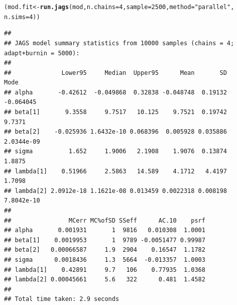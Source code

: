 \documentclass{beamer}\usepackage[]{graphicx}\usepackage[]{color}
\makeatletter
\newcommand{\hlnum}[1]{\textcolor[rgb]{0.686,0.059,0.569}{#1}}%
\newcommand{\hlstr}[1]{\textcolor[rgb]{0.192,0.494,0.8}{#1}}%
\newcommand{\hlstd}[1]{\textcolor[rgb]{0.345,0.345,0.345}{#1}}%
\newcommand{\hlkwb}[1]{\textcolor[rgb]{0.69,0.353,0.396}{#1}}%
\newcommand{\hlkwc}[1]{\textcolor[rgb]{0.333,0.667,0.333}{#1}}%
\newcommand{\hlkwd}[1]{\textcolor[rgb]{0.737,0.353,0.396}{\textbf{#1}}}%
\newenvironment{kframe}{%
 \def\at@end@of@kframe{}%
 \ifinner\ifhmode%
  \def\at@end@of@kframe{\end{minipage}}%
  \begin{minipage}{\columnwidth}%
 \fi\fi%
 \def\FrameCommand##1{\hskip\@totalleftmargin \hskip-\fboxsep
 \colorbox{shadecolor}{##1}\hskip-\fboxsep
     \hskip-\linewidth \hskip-\@totalleftmargin \hskip\columnwidth}%
 \MakeFramed {\advance\hsize-\width
   \@totalleftmargin\z@ \linewidth\hsize
   \@setminipage}}%
 {\par\unskip\endMakeFramed%
 \at@end@of@kframe}
\newenvironment{knitrout}{}{} %
\makeatother
\begin{document}
\newsavebox{\ipriorjagsc}
\begin{lrbox}{\ipriorjagsc}
\begin{knitrout}\scriptsize
{}\color{fgcolor}\begin{kframe}
\begin{alltt}
\hlstd{(mod.fit} \hlkwb{<-} \hlkwd{run.jags}\hlstd{(mod,} \hlkwc{n.chains} \hlstd{=} \hlnum{4}\hlstd{,} \hlkwc{sample} \hlstd{=} \hlnum{2500}\hlstd{,} \hlkwc{method} \hlstd{=} \hlstr{"parallel"}\hlstd{,}
                     \hlkwc{n.sims} \hlstd{=} \hlnum{4}\hlstd{))}
\end{alltt}
\begin{verbatim}
## 
## JAGS model summary statistics from 10000 samples (chains = 4; adapt+burnin = 5000):
##                                                                       
##              Lower95     Median  Upper95      Mean       SD       Mode
## alpha       -0.42612  -0.049868  0.32838 -0.048748  0.19132  -0.064045
## beta[1]       9.3558     9.7517   10.125    9.7521  0.19742     9.7371
## beta[2]    -0.025936 1.6432e-10 0.068396  0.005928 0.035886 2.0344e-09
## sigma          1.652     1.9006   2.1908    1.9076  0.13874     1.8875
## lambda[1]    0.51966     2.5863   14.589    4.1712   4.4197     1.7098
## lambda[2] 2.0912e-18 1.1621e-08 0.013459 0.0022318 0.008198 7.8042e-10
##                                                      
##                MCerr MC%ofSD SSeff      AC.10    psrf
## alpha       0.001931       1  9816   0.010308  1.0001
## beta[1]    0.0019953       1  9789 -0.0051477 0.99987
## beta[2]   0.00066587     1.9  2904    0.16547  1.1782
## sigma      0.0018436     1.3  5664  -0.013357  1.0003
## lambda[1]    0.42891     9.7   106    0.77935  1.0368
## lambda[2] 0.00045661     5.6   322      0.481  1.4582
## 
## Total time taken: 2.9 seconds
\end{verbatim}
\end{kframe}
\end{knitrout}
\end{lrbox}
\end{document}
